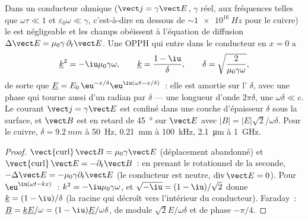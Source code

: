 \begin{theorem}\label{thm:b2:waves-in-media:skin}
Dans un conducteur ohmique ($\vect j = \gamma\vect E$, $\gamma$ réel, aux fréquences
telles que $\omega\tau \ll 1$ et $\varepsilon_0\omega \ll \gamma$, c'est-à-dire en dessous de $\sim\qty{1e16}{Hz}$ pour le
cuivre) le  est négligeable et les champs obéissent à
l'équation de diffusion $\Delta\vect E = \mu_0\gamma\,\partial_t\vect E$. Une OPPH qui entre dans
le conducteur en $x = 0$ a
\[
\underline k^2 = -\iu\mu_0\gamma\omega , \qquad \underline k = \frac{1 - \iu}\delta , \qquad
\delta = \sqrt{\frac2{\mu_0\gamma\omega}} ,
\]
de sorte que $\underline E = E_0\,\eu^{-x/\delta}\eu^{\iu(\omega t - x/\delta)}$~: elle est amortie
sur l'\emph{} $\delta$, avec une phase qui tourne aussi d'un
radian par $\delta$ --- une longueur d'onde $2\pi\delta$, une  $\omega\delta \ll
c$. Le courant $\vect j = \gamma\vect E$ est confiné dans une couche d'épaisseur
$\delta$ sous la surface, et $\vect B$ est en retard de \qty{45}{\degree} sur $\vect E$ avec
$|B| = |E|\sqrt2/\omega\delta$. Pour le cuivre, $\delta = \qty{9.2}{mm}$ à \qty{50}{Hz},
\qty{0.21}{mm} à \qty{100}{kHz}, \qty{2.1}{\micro m} à \qty{1}{GHz}.
\end{theorem}

\begin{proof}
$\operatorname{\vect{curl}}\vect B = \mu_0\gamma\vect E$ (déplacement abandonné) et
$\operatorname{\vect{curl}}\vect E = -\partial_t\vect B$~: en prenant le rotationnel de la seconde,
$-\Delta\vect E = -\mu_0\gamma\partial_t\vect E$ (le conducteur est neutre, $\operatorname{div}
\vect E = 0$). Pour $\eu^{\iu(\omega t - kx)}$~: $k^2 = -\iu\mu_0\gamma\omega$, et
$\sqrt{-\iu} = (1 - \iu)/\sqrt2$ donne $\underline k = (1 - \iu)/\delta$ (la racine qui
décroît vers l'intérieur du conducteur). Faraday~: $\underline B = \underline k\underline E/\omega = (1 - \iu)
\underline E/\omega\delta$, de module $\sqrt2E/\omega\delta$ et de phase $-\pi/4$.
\end{proof}

